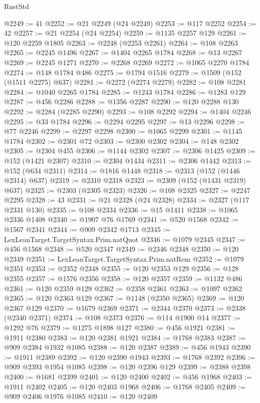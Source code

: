 \begin{lexlean}{RustStd}
\begin{coremodule}
@2249 := 41
@2252 := @21 @2249 (@24 @2249)
@2253 := @117 @2252
@2254 := 42
@2257 := @21 @2254 (@24 @2254)
@2259 := @1135 @2257 @129
@2261 := @120 @2259 @1805
@2263 := @2248 (@2253 @2261)
@2264 := @108 @2263
@2265 := @2245 @1496
@2267 := @1404 @2265 @1784
@2268 := @13 @2267
@2269 := @2245 @1271
@2270 := @2268 @2269
@2272 := @1065 @2270 @1784
@2274 := @148 @1784 @486
@2275 := @1794 @1516
@2279 := @1509 (@152 (@1511 @2275) @637)
@2281 := @2272 (@2274 @2279)
@2282 := @108 @2281
@2284 := @1040 @2265 @1784
@2285 := @1243 @1784
@2286 := @1283 @129
@2287 := @456 @2286
@2288 := @1356 @2287
@2290 := @120 @2288 @130
@2292 := @2284 (@2285 @2290)
@2293 := @108 @2292
@2294 := @1404 @2246
@2295 := @33 @1784
@2296 := @2294 @2295
@2297 := @13 @2296
@2298 := @77 @2246
@2299 := @2297 @2298
@2300 := @1065 @2299
@2301 := @1145 @1784
@2302 := @2301 @72
@2303 := @2300 @2302
@2304 := @148 @2302
@2305 := @2304 @455
@2306 := @1144 @2302
@2307 := @2306 @1425
@2309 := @152 (@1421 @2307)
@2310 := @2304 @1434
@2311 := @2306 @1442
@2313 := @152 (@634 @2311)
@2314 := @1816 @1448
@2318 := @2313 (@152 (@1446 @2314) @637)
@2319 := @2310 @2318
@2323 := @2309 (@152 (@1431 @2319) @637)
@2325 := @2303 (@2305 @2323)
@2326 := @108 @2325
@2327 := @2247 @2295
@2328 := 43
@2331 := @21 @2328 (@24 @2328)
@2334 := @2327 (@117 @2331 @130)
@2335 := @108 @2334
@2336 := @15 @1411
@2338 := @1065 @2336 @1408
@2340 := @1907 @76 @1769
@2341 := @520 @1568
@2342 := @1567 @2341
@2344 := @909 @2342 @1713
@2345 := LexLeanTarget.TargetSyntax.Prim.natQuot
@2346 := @1079 @2345
@2347 := @456 @1568
@2348 := @520 @2347
@2349 := @2346 @2348
@2350 := @120 @2349
@2351 := LexLeanTarget.TargetSyntax.Prim.natRem
@2352 := @1079 @2351
@2353 := @2352 @2348
@2355 := @120 @2353 @129
@2356 := @128 @2355
@2357 := @1576 @2356
@2358 := @120 @2357
@2359 := @1132 @486
@2361 := @120 @2359 @129
@2362 := @2358 @2361
@2363 := @1097 @2362
@2365 := @120 @2363 @129
@2367 := @1148 (@2350 @2365)
@2369 := @120 @2367 @129
@2370 := @1679 @2369
@2371 := @2344 @2370
@2373 := @2338 (@2340 @2371)
@2374 := @108 @2373
@2376 := @114 @1900 @14
@2377 := @1292 @76
@2379 := @1275 @1898 @127
@2380 := @456 @1921
@2381 := @1911 @2380
@2383 := @120 @2381 @1921
@2384 := @1768 @2383
@2387 := @909 @2384 @1932 @1085
@2388 := @120 @2387
@2389 := @456 @1943
@2390 := @1911 @2389
@2392 := @120 @2390 @1943
@2393 := @1768 @2392
@2396 := @909 @2393 @1954 @1085
@2398 := @120 @2396 @129
@2399 := @2388 @2398
@2400 := @1681 @2399
@2401 := @120 @2400
@2402 := @456 @1968
@2403 := @1911 @2402
@2405 := @120 @2403 @1968
@2406 := @1768 @2405
@2409 := @909 @2406 @1976 @1085
@2410 := @120 @2409

\end{coremodule}
\end{lexlean}
